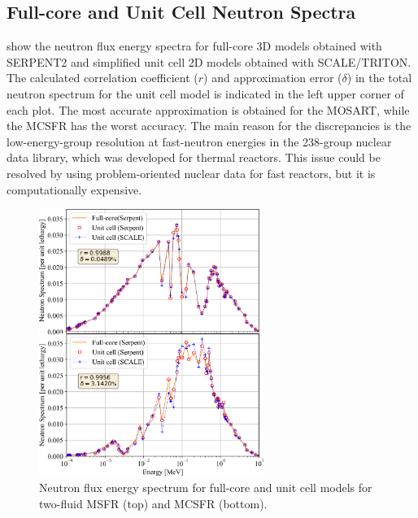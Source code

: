 \documentclass[letterpaper]{mandc2019}
\begin{document}
\subsection{Full-core and Unit Cell Neutron Spectra}
 show the neutron flux energy spectra for full-core 3D models obtained with SERPENT2 and simplified unit cell 2D models obtained with SCALE/TRITON. 
The calculated correlation coefficient ($r$) and approximation error ($\delta$) in the total neutron spectrum for the unit cell model is indicated in the left upper corner of each plot. 
The most accurate approximation is obtained for the \gls{MOSART}, while the \gls{MCSFR} has the worst accuracy. 
The main reason for the discrepancies is the low-energy-group resolution at fast-neutron energies in the 238-group nuclear data library, which was developed for thermal reactors. 
This issue could be resolved by using problem-oriented nuclear data for fast reactors, but it is computationally expensive.
\begin{figure}[t!]
   \vspace{-0.35in}
  \centering
  \includegraphics[width=0.65\textwidth]{./Figures/two_full_vs_unit_spectrum.png}
   \vspace{-0.05in}
  \caption{Neutron flux energy spectrum for full-core and unit cell models for two-fluid \gls{MSFR} (top) and \gls{MCSFR} (bottom).}
     \vspace{-0.45in}
  \label{fig:spectrum_two}
\end{figure}
\end{document}
